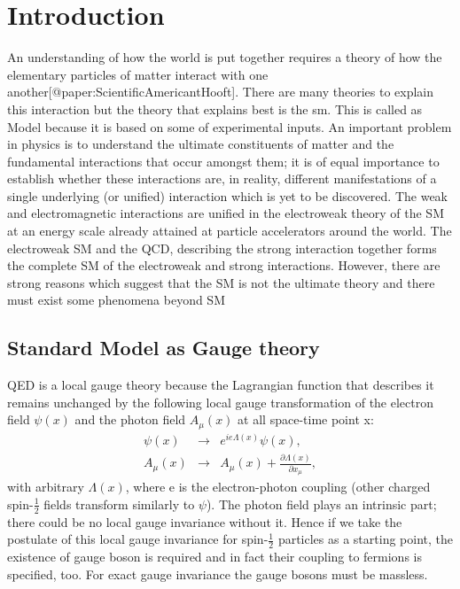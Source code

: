 \chapter{Introduction}

An understanding of how the world is put together requires a theory of how the elementary particles of matter interact with one another[@paper:ScientificAmericantHooft]. There are many theories to explain this interaction but the theory that explains best is the sm. This is called as Model because it is based on some of experimental inputs. An important problem in physics is to understand the ultimate constituents of matter and the fundamental interactions that occur amongst them; it is of equal importance to establish whether these interactions are, in reality, different manifestations of a single underlying (or unified) interaction which is yet to be discovered. The weak and electromagnetic interactions are unified in the electroweak theory of the SM at an energy scale already attained at particle accelerators around the world. The electroweak SM and the QCD, describing the strong interaction together forms the complete SM of the electroweak and strong interactions. However, there are strong reasons which suggest that the SM is not the ultimate theory and there must exist some phenomena beyond SM \cite{paper:ScientificAmericanChrisQuiggEPF} \cite{article:PAdventure}

\section{Standard Model as Gauge theory}

QED is a local gauge theory because the Lagrangian function that describes it remains unchanged by the following local gauge transformation of the electron field $\psi(x)$ and the photon field $A_\mu(x)$ at all space-time point x:
    \begin{eqnarray}
    \psi(x) & \rightarrow & e^{ie\Lambda(x)}\psi(x), \nonumber \\
    A_\mu(x) & \rightarrow & A_\mu(x) + \frac{\partial \Lambda(x)}{\partial x_\mu}, \nonumber
    \end{eqnarray}
with arbitrary $\Lambda(x)$, where e is the electron-photon coupling (other charged spin-$\frac{1}{2}$ fields transform similarly to $\psi$). The photon field plays an intrinsic part; there could be no local gauge invariance without it. Hence if we take the postulate of this local gauge invariance for spin-$\frac{1}{2}$ particles as a starting point, the existence of gauge boson is required and in fact their coupling to fermions is specified, too. For exact gauge invariance the gauge bosons must be massless.


